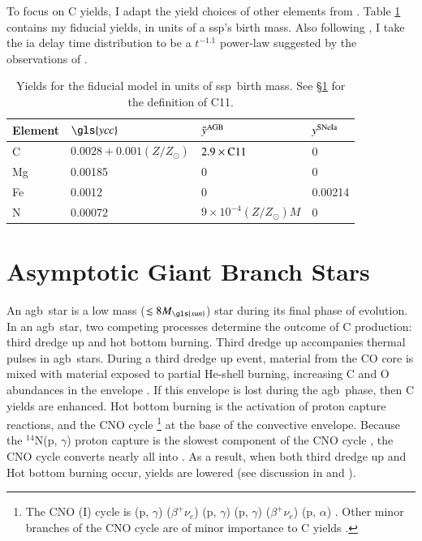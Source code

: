 \documentclass[12pt,oneside,letterpaper]{report}
\newcommand{\agb}{\gls{agb}}
\newcommand{\ia}{\gls{ia}}
\newcommand{\ssp}{\gls{ssp}}
\newcommand{\Ycc}{\gls{ycc}}
\newcommand{\sun}{\gls{sun}}
\newcommand{\alp}{$\alpha$}
\begin{document}
To focus on C yields, I adapt the yield choices of other elements from \citet{james+21, james+23}.
Table \ref{tab:fiducial_mod} contains my fiducial yields, in units of a \ssp's birth mass.
Also following \citet{james+21, james+23}, I take the \ia{} delay time distribution to be a
$t^{-1.1}$ power-law suggested by the observations of \citet{maoz+12}.


\begin{table}
	\centering
    \caption[Fiducial Model]{Yields for the fiducial model in units of \ssp~birth mass. See \S\ref{sec:agb} for the definition of C11.}
	\label{tab:fiducial_mod}

	\begin{tabular}{l l l l}
		\toprule
        Element & $\Ycc$ & $\tilde{y}^{\rm AGB}$ & $y^{\rm SNe Ia}$ \\
		\midrule
        C & $0.0028 + 0.001(Z/Z_\odot)$ & $2.9\times{\rm C11}$ &  0 \\
        Mg & 0.00185 & 0 & 0 \\
        Fe & 0.0012 & 0 & 0.00214 \\
        N & 0.00072 & $9\times10^{-4}(Z/Z_\odot)M$ & 0\\
		\bottomrule
	\end{tabular}
\end{table}

\section{Asymptotic Giant Branch Stars}\label{sec:agb}


An \agb\ star is a low mass ($\lesssim 8 M_{\sun}$) star during its final phase of evolution.  In an \agb\ star, two competing processes determine the outcome of C production: third dredge up and hot bottom burning.  Third dredge up accompanies thermal pulses in \agb\ stars. During a third dredge up event, material from the CO core is mixed with material exposed to partial He-shell burning, increasing C and O abundances in the envelope \citep{KL14}. If this envelope is lost during the \agb\ phase, then C yields are enhanced.
Hot bottom burning is the activation of proton capture reactions, and the CNO cycle%
\footnote{The CNO (I) cycle is
(p, $\gamma$)
($\beta^+ \nu_e$)
(p, $\gamma$)
(p, $\gamma$)
($\beta^{+}\nu_e$)
(p, \alp)
.
 Other minor branches of the CNO cycle are of minor importance to C yields
 \citep{solar-fusion}.
}
at the base of the convective envelope. Because the $^{14}$N(p, $\gamma$) proton capture is the slowest component of the CNO cycle \citep{solar-fusion}, the CNO cycle converts nearly all  into .
As a result, when both third dredge up and Hot bottom burning occur,  yields are lowered (see discussion in \citealt{james+23} and \citealt{ventura+13}).
\end{document}
